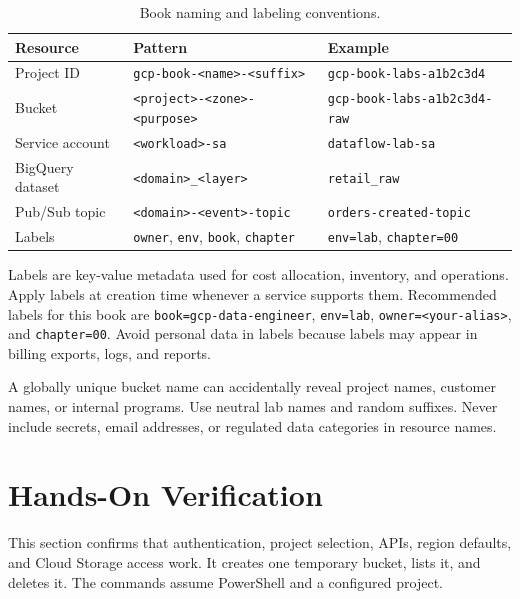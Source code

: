 \begin{table}[H]
\centering
\small
\begin{tabular}{@{}p{3.0cm}p{4.1cm}p{5.0cm}@{}}
\toprule
\textbf{Resource} & \textbf{Pattern} & \textbf{Example} \\
\midrule
Project ID & \texttt{gcp-book-<name>-<suffix>} & \texttt{gcp-book-labs-a1b2c3d4} \\
Bucket & \texttt{<project>-<zone>-<purpose>} & \texttt{gcp-book-labs-a1b2c3d4-raw} \\
Service account & \texttt{<workload>-sa} & \texttt{dataflow-lab-sa} \\
BigQuery dataset & \texttt{<domain>\_<layer>} & \texttt{retail\_raw} \\
Pub/Sub topic & \texttt{<domain>-<event>-topic} & \texttt{orders-created-topic} \\
Labels & \texttt{owner}, \texttt{env}, \texttt{book}, \texttt{chapter} & \texttt{env=lab}, \texttt{chapter=00} \\
\bottomrule
\end{tabular}
\caption{Book naming and labeling conventions.}
\label{tab:chapter0-naming}
\end{table}

Labels are key-value metadata used for cost allocation, inventory, and operations. Apply labels at creation time whenever a service supports them. Recommended labels for this book are \texttt{book=gcp-data-engineer}, \texttt{env=lab}, \texttt{owner=<your-alias>}, and \texttt{chapter=00}. Avoid personal data in labels because labels may appear in billing exports, logs, and reports.

\begin{pitfall}
A globally unique bucket name can accidentally reveal project names, customer names, or internal programs. Use neutral lab names and random suffixes. Never include secrets, email addresses, or regulated data categories in resource names.
\end{pitfall}

\section{Hands-On Verification}
This section confirms that authentication, project selection, APIs, region defaults, and Cloud Storage access work. It creates one temporary bucket, lists it, and deletes it. The commands assume PowerShell and a configured project.

